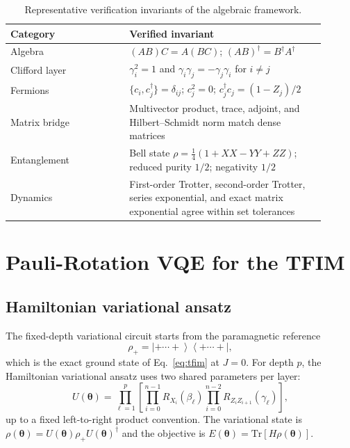 \documentclass[11pt]{article}
\newcommand{\Tr}{\mathrm{Tr}}
\newcommand{\ket}[1]{\left|#1\right\rangle}
\newcommand{\bra}[1]{\left\langle#1\right|}
\begin{document}
\begin{table}[h]
\centering
\caption{Representative verification invariants of the algebraic framework.}
\label{tab:kernel}
\begin{tabular}{p{0.34\linewidth}p{0.56\linewidth}}
\toprule
Category & Verified invariant \\
\midrule
Algebra & $(AB)C=A(BC)$; $(AB)^\dagger=B^\dagger A^\dagger$ \\
Clifford layer & $\gamma_i^2=1$ and $\gamma_i\gamma_j=-\gamma_j\gamma_i$ for $i\ne j$ \\
Fermions & $\{c_i,c_j^\dagger\}=\delta_{ij}$; $c_j^2=0$; $c_j^\dagger c_j=(1-Z_j)/2$ \\
Matrix bridge & Multivector product, trace, adjoint, and Hilbert--Schmidt norm match dense matrices \\
Entanglement & Bell state $\rho=\frac14(1+XX-YY+ZZ)$; reduced purity $1/2$; negativity $1/2$ \\
Dynamics & First-order Trotter, second-order Trotter, series exponential, and exact matrix exponential agree within set tolerances \\
\bottomrule
\end{tabular}
\end{table}

\section{Pauli-Rotation VQE for the TFIM}

\subsection{Hamiltonian variational ansatz}

The fixed-depth variational circuit starts from the paramagnetic reference
\begin{equation}
    \rho_+ = \ket{+\cdots +}\bra{+\cdots +},
\end{equation}
which is the exact ground state of Eq.~\eqref{eq:tfim} at $J=0$.  For depth $p$, the Hamiltonian variational ansatz uses two shared parameters per layer:
\begin{equation}
    U(\boldsymbol\theta)=\prod_{\ell=1}^{p}
    \left[
    \prod_{i=0}^{n-1} R_{X_i}(\beta_\ell)
    \prod_{i=0}^{n-2} R_{Z_iZ_{i+1}}(\gamma_\ell)
    \right],
    \label{eq:hva}
\end{equation}
up to a fixed left-to-right product convention.  The variational state is
$\rho(\boldsymbol\theta)=U(\boldsymbol\theta)\rho_+U(\boldsymbol\theta)^\dagger$
and the objective is $E(\boldsymbol\theta)=\Tr[H\rho(\boldsymbol\theta)]$.
\end{document}
